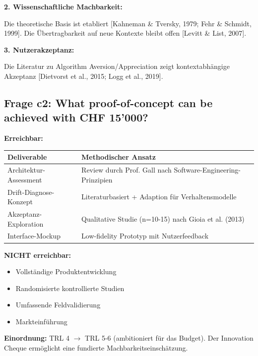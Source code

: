 \documentclass[11pt,a4paper]{article}
\newcommand{\evidence}[1]{\textcolor{fehrgray}{[#1]}}
\begin{document}
\textbf{2. Wissenschaftliche Machbarkeit:}

Die theoretische Basis ist etabliert \evidence{Kahneman \& Tversky, 1979; Fehr \& Schmidt, 1999}. Die Übertragbarkeit auf neue Kontexte bleibt offen \evidence{Levitt \& List, 2007}.

\textbf{3. Nutzerakzeptanz:}

Die Literatur zu Algorithm Aversion/Appreciation zeigt kontextabhängige Akzeptanz \evidence{Dietvorst et al., 2015; Logg et al., 2019}.

\subsection{Frage c2: What proof-of-concept can be achieved with CHF 15'000?}

\textbf{Erreichbar:}

\begin{table}[h]
\centering
\begin{tabular}{@{}L{4cm}L{9cm}@{}}
\toprule
\textbf{Deliverable} & \textbf{Methodischer Ansatz} \\
\midrule
Architektur-Assessment & Review durch Prof. Gall nach Software-Engineering-Prinzipien \\
Drift-Diagnose-Konzept & Literaturbasiert + Adaption für Verhaltensmodelle \\
Akzeptanz-Exploration & Qualitative Studie (n=10-15) nach Gioia et al. (2013) \\
Interface-Mockup & Low-fidelity Prototyp mit Nutzerfeedback \\
\bottomrule
\end{tabular}
\end{table}

\textbf{NICHT erreichbar:}
\begin{itemize}[leftmargin=2em]
    \item Vollständige Produktentwicklung
    \item Randomisierte kontrollierte Studien
    \item Umfassende Feldvalidierung
    \item Markteinführung
\end{itemize}

\textbf{Einordnung:} TRL 4 $\rightarrow$ TRL 5-6 (ambitioniert für das Budget). Der Innovation Cheque ermöglicht eine fundierte Machbarkeitseinschätzung.

\end{document}
